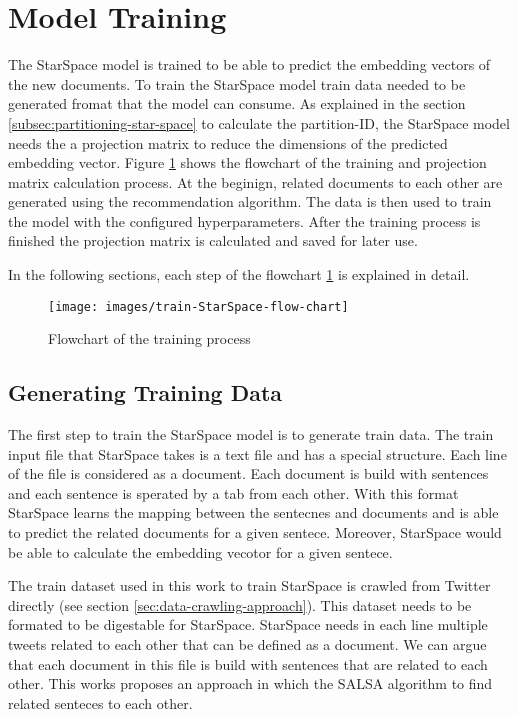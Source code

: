 \section{Model Training}
\label{sec:model-training}
The StarSpace model is trained to be able to predict the embedding vectors of the new documents. To train the StarSpace model train data needed to be generated fromat that the model can consume. As explained in the section \ref{subsec:partitioning-star-space} to calculate the partition-ID, the StarSpace model needs the a projection matrix to reduce the dimensions of the predicted embedding vector. Figure \ref{fig:star-space-training} shows the flowchart of the training and projection matrix calculation process. At the beginign, related documents to each other are generated using the recommendation algorithm. The data is then used to train the model with the configured hyperparameters. After the training process is finished the projection matrix is calculated and saved for later use.

In the following sections, each step of the flowchart \ref{fig:star-space-training} is explained in detail.

\begin{figure}[!h]
	\centering
	\texttt{[image: images/train-StarSpace-flow-chart]}
	\caption{Flowchart of the training process}
	\label{fig:star-space-training}
\end{figure}

\subsection{Generating Training Data}
\label{subsec:generating-training-data}
The first step to train the StarSpace model is to generate train data. The train input file that StarSpace takes is a text file and has a special structure. Each line of the file is considered as a document. Each document is build with sentences and each sentence is sperated by a tab from each other. With this format StarSpace learns the mapping between the sentecnes and documents and is able to predict the related documents for a given sentece. Moreover, StarSpace would be able to calculate the embedding vecotor for a given sentece.


The train dataset used in this work to train StarSpace is crawled from Twitter directly (see section \ref{sec:data-crawling-approach}). This dataset needs to be formated to be digestable for StarSpace. StarSpace needs in each line multiple tweets related to each other that can be defined as a document. We can argue that each document in this file is build with sentences that are related to each other. This works proposes an approach in which the SALSA algorithm to find related senteces to each other.


